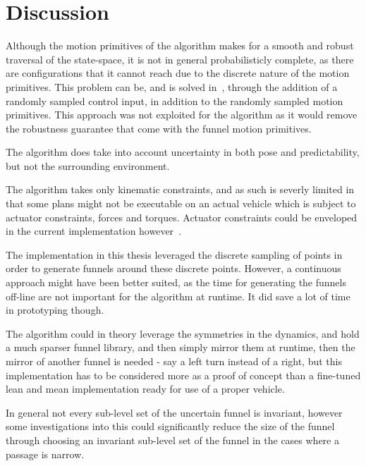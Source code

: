 \chapter{Discussion}

Although the motion primitives of the \rrtfunnel{} algorithm makes for a smooth
and robust traversal of the state-space, it is not in general probabilisticly
complete, as there are configurations that it cannot reach due to the discrete
nature of the motion primitives. This problem can be, and is solved
in~\cite{vonasekGlobalMotionPlanning2013}, through the addition of a randomly
sampled control input, in addition to the randomly sampled motion primitives.
This approach was not exploited for the \rrtfunnel{} algorithm as it would
remove the robustness guarantee that come with the funnel motion primitives.

The algorithm does take into account uncertainty in both pose and
predictability, but not the surrounding environment.

The algorithm takes only kinematic constraints, and as such is severly limited
in that some plans might not be executable on an actual vehicle which is subject
to actuator constraints, forces and torques. Actuator constraints could be
enveloped in the current implementation
however~\cite{majumdarFunnelLibrariesRealtime2017}.

The implementation in this thesis leveraged the discrete sampling of points in
order to generate funnels around these discrete points. However, a continuous
approach might have been better suited, as the time for generating the funnels
off-line are not important for the algorithm at runtime. It did save a lot of
time in prototyping though.

The algorithm could in theory leverage the symmetries in the dynamics, and hold
a much sparser funnel library, and then simply mirror them at runtime, then the
mirror of another funnel is needed - say a left turn instead of a right, but
this implementation has to be considered more as a proof of concept than a
fine-tuned lean and mean implementation ready for use of a proper vehicle.

In general not every sub-level set of the uncertain funnel is invariant, however
some investigations into this could significantly reduce the size of the funnel
through choosing an invariant sub-level set of the funnel in the cases where a
passage is narrow.